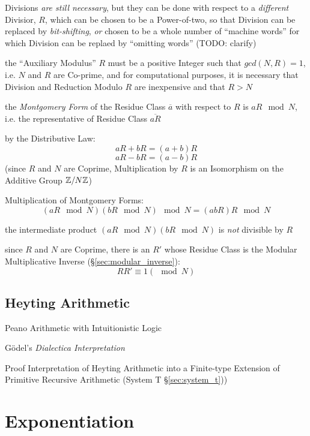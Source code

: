 Divisions \emph{are still necessary}, but they can be done with respect to a
\emph{different} Divisior, $R$, which can be chosen to be a Power-of-two, so
that Division can be replaced by \emph{bit-shifting}, \emph{or} chosen to be a
whole number of ``machine words'' for which Division can be replaed by
``omitting words'' (TODO: clarify)

the ``Auxiliary Modulus'' $R$ must be a positive Integer such that
$gcd(N, R) = 1$, i.e. $N$ and $R$ are Co-prime, and for computational purposes,
it is necessary that Division and Reduction Modulo $R$ are inexpensive and that
$R > N$

the \emph{Montgomery Form} of the Residue Class $\overline{a}$ with respect to
$R$ is $aR \mod N$, i.e. the representative of Residue Class $\overline{aR}$

by the Distributive Law:
\[
  aR + bR = (a + b) R
\] \[
  aR - bR = (a - b) R
\]
(since $R$ and $N$ are Coprime, Multiplication by $R$ is an Isomorphism on the
Additive Group $\mathbb{Z} / N \mathbb{Z}$)

Multiplication of Montgomery Forms:
\[
  (aR \mod N) (bR \mod N) \mod N = (abR)R \mod N
\]

the intermediate product $(aR \mod N) (bR \mod N)$ is \emph{not} divisible by
$R$

since $R$ and $N$ are Coprime, there is an $R'$ whose Residue Class is the
Modular Multiplicative Inverse (\S\ref{sec:modular_inverse}):
\[
  R R' \equiv 1 (\mod N)
\]



\subsection{Heyting Arithmetic}\label{sec:heyting_arithmetic}

Peano Arithmetic with Intuitionistic Logic

G\"odel's \emph{Dialectica Interpretation}

Proof Interpretation of Heyting Arithmetic into a Finite-type Extension of
Primitive Recursive Arithmetic (System T \S\ref{sec:system_t}))



\section{Exponentiation}\label{sec:exponentiation}

